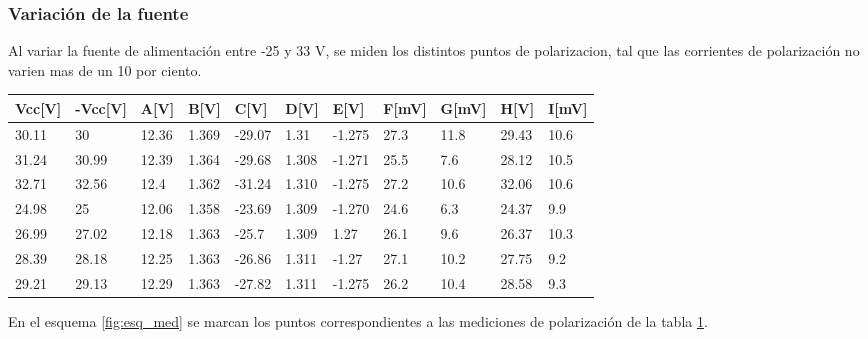 		\subsubsection{Variación de la fuente}
		Al variar la fuente de alimentación entre -25 y 33 V, se miden los distintos puntos de polarizacion, tal que las corrientes de polarización no varien mas de un 10 por ciento.
		\begin{table}[]
		\begin{tabular}{|l|l|l|l|l|l|l|l|l|l|l|}
		\hline
		Vcc{[}V{]} & -Vcc{[}V{]} & A{[}V{]} & B{[}V{]} & C{[}V{]} & D{[}V{]} & E{[}V{]} & F{[}mV{]} & G{[}mV{]} & H{[}V{]} & I{[}mV{]} \\ \hline
		30.11      & 30          & 12.36    & 1.369    & -29.07   & 1.31     & -1.275   & 27.3      & 11.8      & 29.43    & 10.6      \\ \hline
		31.24      & 30.99       & 12.39    & 1.364    & -29.68   & 1.308    & -1.271   & 25.5      & 7.6       & 28.12    & 10.5      \\ \hline
		32.71      & 32.56       & 12.4     & 1.362    & -31.24   & 1.310    & -1.275   & 27.2      & 10.6      & 32.06    & 10.6      \\ \hline
		24.98      & 25          & 12.06    & 1.358    & -23.69   & 1.309    & -1.270   & 24.6      & 6.3       & 24.37    & 9.9       \\ \hline
		26.99      & 27.02       & 12.18    & 1.363    & -25.7    & 1.309    & 1.27     & 26.1      & 9.6       & 26.37    & 10.3      \\ \hline
		28.39      & 28.18       & 12.25    & 1.363    & -26.86   & 1.311    & -1.27    & 27.1      & 10.2      & 27.75    & 9.2       \\ \hline
		29.21      & 29.13       & 12.29    & 1.363    & -27.82   & 1.311    & -1.275   & 26.2      & 10.4      & 28.58    & 9.3       \\ \hline
		\end{tabular}
		\label{tab.valores}
		\end{table}

		En el esquema \ref{fig:esq_med} se marcan los puntos correspondientes a las mediciones de polarización de la tabla \ref{tab.valores}.

